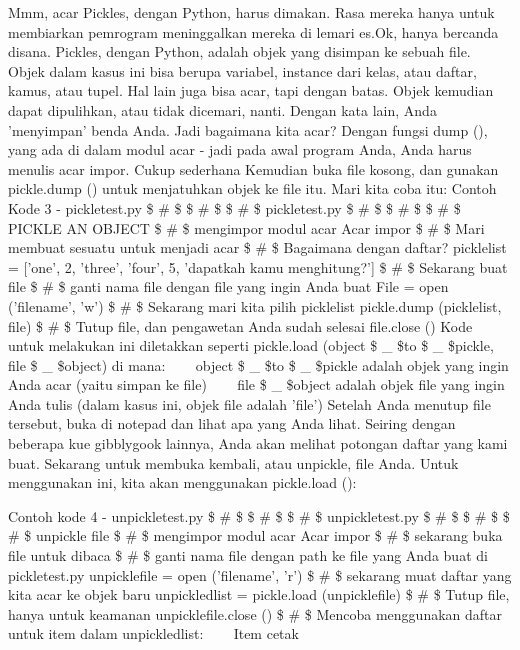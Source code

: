 Mmm, acar Pickles, dengan Python, harus dimakan. Rasa mereka hanya untuk membiarkan pemrogram meninggalkan mereka di lemari es.Ok, hanya bercanda disana. Pickles, dengan Python, adalah objek yang disimpan ke sebuah file. Objek dalam kasus ini bisa berupa variabel, instance dari kelas, atau daftar, kamus, atau tupel. Hal lain juga bisa acar, tapi dengan batas. Objek kemudian dapat dipulihkan, atau tidak dicemari, nanti. Dengan kata lain, Anda 'menyimpan' benda Anda. Jadi bagaimana kita acar? Dengan fungsi dump (), yang ada di dalam modul acar - jadi pada awal program Anda, Anda harus menulis acar impor. Cukup sederhana Kemudian buka file kosong, dan gunakan pickle.dump () untuk menjatuhkan objek ke file itu. Mari kita coba itu: 
Contoh Kode 3 - pickletest.py 
 \$  \#  \$ \$  \#  \$ \$  \#  \$ pickletest.py  
 \$  \#  \$ \$  \#  \$ \$  \#  \$ PICKLE AN OBJECT 
 \$  \#  \$ mengimpor modul acar  
Acar impor 
 \$  \#  \$ Mari membuat sesuatu untuk menjadi acar  
 \$  \#  \$ Bagaimana dengan daftar?  
picklelist = ['one', 2, 'three', 'four', 5, 'dapatkah kamu menghitung?'] 
 \$  \#  \$ Sekarang buat file  
 \$  \#  \$ ganti nama file dengan file yang ingin Anda buat 
File = open ('filename', 'w') 
 \$  \#  \$ Sekarang mari kita pilih picklelist 
pickle.dump (picklelist, file) 
 \$  \#  \$ Tutup file, dan pengawetan Anda sudah selesai  
file.close () 
Kode untuk melakukan ini diletakkan seperti pickle.load (object \$  \_  \$to \$  \_  \$pickle, file \$  \_  \$object) di mana: 
~~~ object \$  \_  \$to \$  \_  \$pickle adalah objek yang ingin Anda acar (yaitu simpan ke file)  
~~~ file \$  \_  \$object adalah objek file yang ingin Anda tulis (dalam kasus ini, objek file adalah 'file') 
Setelah Anda menutup file tersebut, buka di notepad dan lihat apa yang Anda lihat. Seiring dengan beberapa kue gibblygook lainnya, Anda akan melihat potongan daftar yang kami buat.  
Sekarang untuk membuka kembali, atau unpickle, file Anda. Untuk menggunakan ini, kita akan menggunakan pickle.load (): \par
Contoh kode 4 - unpickletest.py 
 \$  \#  \$ \$  \#  \$ \$  \#  \$ unpickletest.py 
 \$  \#  \$ \$  \#  \$ \$  \#  \$ unpickle file 
 \$  \#  \$ mengimpor modul acar 
Acar impor 
 \$  \#  \$ sekarang buka file untuk dibaca 
 \$  \#  \$ ganti nama file dengan path ke file yang Anda buat di pickletest.py 
unpicklefile = open ('filename', 'r') 
 \$  \#  \$ sekarang muat daftar yang kita acar ke objek baru 
unpickledlist = pickle.load (unpicklefile) 
 \$  \#  \$ Tutup file, hanya untuk keamanan  
unpicklefile.close () 
 \$  \#  \$ Mencoba menggunakan daftar
untuk item dalam unpickledlist: 
~~~ Item cetak 
